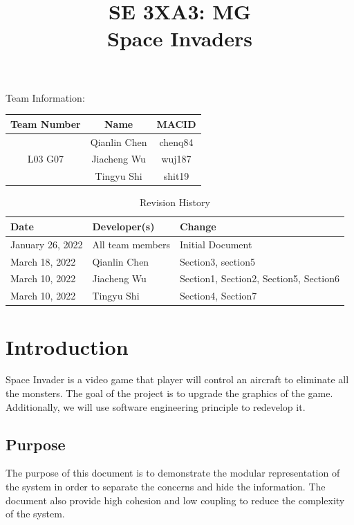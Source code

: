 \documentclass[12pt]{article}
\title{SE 3XA3: MG\\Space Invaders}
\begin{document}
\maketitle

{\Large Team Information:}
\begin{table}[htp]
\centering
{\Large
\begin{tabular}{|c|c|c|}
\hline
\multicolumn{1}{|l|}{Team Number} & Name         & MACID   \\ \hline
\multirow{3}{*}{L03 G07}          & Qianlin Chen & chenq84 \\ \cline{2-3} 
                                  & Jiacheng Wu  & wuj187  \\ \cline{2-3} 
                                  & Tingyu Shi   & shit19  \\ \hline
\end{tabular}
}
\end{table}

\newpage
\begin{table}[htp]
\caption{Revision History} 
\begin{tabularx}{\textwidth}{llX}
\toprule
\textbf{Date} & \textbf{Developer(s)} & \textbf{Change}\\
\midrule
January 26, 2022 & All team members & Initial Document\\
March 18, 2022 & Qianlin Chen & Section3, section5\\
March 10, 2022 & Jiacheng Wu & Section1, Section2, Section5, Section6\\
March 10, 2022 & Tingyu Shi & Section4, Section7\\
\bottomrule
\end{tabularx}
\end{table}
\newpage
\tableofcontents
\listoftables
\listoffigures
\cleardoublepage

\section{Introduction}
Space Invader is a video game that player will control an aircraft to eliminate all the monsters. The goal of the project is to upgrade the graphics of the game. Additionally, we will use software engineering principle to redevelop it.

\subsection{Purpose}
The purpose of this document is to demonstrate the modular representation of the system in order to separate the concerns and hide the information. The document also provide high cohesion and low coupling to reduce the complexity of the system.
\end{document}
